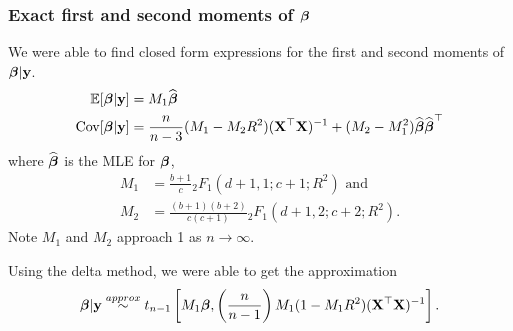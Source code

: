 \documentclass[notes=only]{beamer}
\begin{document}
\begin{frame}
	\frametitle{Exact first and second moments of ${\boldsymbol \beta}$}
	We were able to find closed form
	expressions for the first and second moments of ${\boldsymbol \beta} | {\bf y}$.
	\small
	\begin{align*}
		\mathbb{E}[{\boldsymbol \beta} | {\bf y}] &= M_1 \widehat{{\boldsymbol \beta}} \\
		\mbox{Cov}[{\boldsymbol \beta} | {\bf y}] &= \frac{n}{n - 3} (M_1 - M_2 R^2)({\bf X}^\top {\bf X})^{-1} + (M_2 - M_1^2) \widehat{{\boldsymbol \beta}} \widehat{{\boldsymbol \beta}}^\top
	\end{align*}
	where $\widehat{{\boldsymbol \beta}}$ is the MLE for ${\boldsymbol \beta}$, 
	\small
	\begin{align*}
		M_1 &= \frac{b + 1}{c} {}_2 F_1 (d + 1, 1; c + 1; R^2) \text{ and } \\
		M_2 &= \frac{(b + 1)(b + 2)}{c(c + 1)} {}_2 F_1 (d + 1, 2; c + 2; R^2).
	\end{align*}
	Note $M_1$ and $M_2$ approach 1 as $n\to\infty$.
	
	Using the delta method, we were able to get the approximation
	\begin{align*}
		{\boldsymbol\beta} | {\bf y} \stackrel{approx}{\sim} t_{n-1} \left[M_1 {\boldsymbol \beta}, \left(\frac{n}{n - 1}\right) M_1 (1 - M_1 R^2)({\bf X}^\top {\bf X})^{-1}\right].
	\end{align*}
\end{frame}


\end{document}

